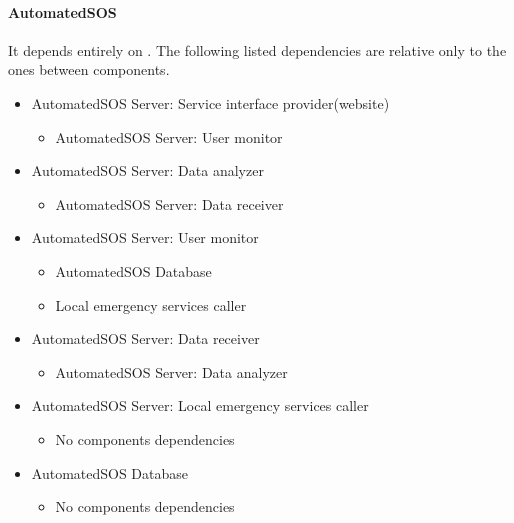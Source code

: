 		\paragraph{AutomatedSOS}
		It depends entirely on . The following listed dependencies are relative only to the ones between  components.
		\begin{itemize}
			\item{AutomatedSOS Server: Service interface provider(website)}
			\begin{itemize}\item{AutomatedSOS Server: User monitor}\end{itemize}

			\item{AutomatedSOS Server: Data analyzer}
			\begin{itemize}\item{AutomatedSOS Server: Data receiver}\end{itemize}

			\item{AutomatedSOS Server: User monitor}
			\begin{itemize}\item{AutomatedSOS Database}\item{Local emergency services caller}\end{itemize}

			\item{AutomatedSOS Server: Data receiver}
			\begin{itemize}\item{AutomatedSOS Server: Data analyzer}\end{itemize}

			\item{AutomatedSOS Server: Local emergency services caller}
			\begin{itemize}\item{No components dependencies}\end{itemize}

			\item{AutomatedSOS Database}
			\begin{itemize}\item{No components dependencies}\end{itemize}
		\end{itemize}

